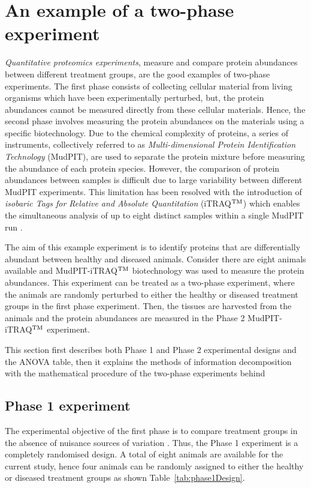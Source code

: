 \documentclass[article]{jss}
\begin{document}
\section[Example of two-phase experiment]{An example of a two-phase experiment} \label{sec:exampleTwoPase}
\emph{Quantitative proteomics experiments}, measure and compare protein abundances between different treatment groups, are the good examples of two-phase experiments. The first phase consists of collecting cellular material from living organisms which have been experimentally perturbed, but, the protein abundances cannot be measured directly from these cellular materials. Hence, the second phase involves measuring the protein abundances on the materials using a specific biotechnology. Due to the chemical complexity of proteins, a series of instruments, collectively referred to as \emph{Multi-dimensional Protein Identification Technology} (MudPIT), are used to separate the protein mixture before measuring the abundance of each protein species. However, the comparison of protein abundances between samples is difficult due to large variability between different MudPIT experiments. This limitation has been resolved with the introduction of \emph{isobaric Tags for Relative and Absolute Quantitation} (iTRAQ$^{\rm TM}$) which enables the simultaneous analysis of up to eight distinct samples within a single MudPIT run \citep{Ross2004, Choe2007}.

The aim of this example experiment is to identify proteins that are differentially abundant between healthy and diseased animals. Consider there are eight animals available and MudPIT-iTRAQ$^{\rm TM}$ biotechnology was used to measure the protein abundances. This experiment can be treated as a two-phase experiment, where the animals are randomly perturbed to either the healthy or diseased treatment groups in the first phase experiment. Then, the tissues are harvested from the animals and the protein abundances are measured in the Phase 2 MudPIT-iTRAQ$^{\rm TM}$ experiment.

This section first describes both Phase 1 and Phase 2 experimental designs and the ANOVA table, then it explains the methods of information decomposition with the mathematical procedure of the two-phase experiments behind  

\subsection{Phase 1 experiment}\label{subsec:Phase1Exp}
The experimental objective of the first phase is to compare treatment groups in the absence of nuisance sources of variation \citep{Mead1988}. Thus, the Phase 1 experiment is a completely randomised design. A total of eight animals are available for the current study, hence four animals can be randomly assigned to either the healthy or diseased treatment groups as shown Table~\ref{tab:phase1Design}.
\end{document}
